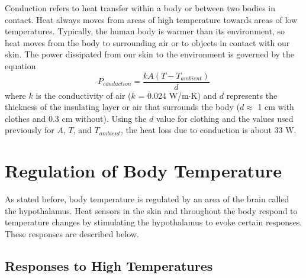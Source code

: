 Conduction refers to heat transfer within a body or between two bodies in contact.  Heat always moves from areas of high temperature towards areas of low temperatures.  Typically, the human body is warmer than its environment, so heat moves from the body to surrounding air or to objects in contact with our skin.  The power dissipated from our skin to the environment is governed by the equation
\begin{equation}\label{eqn4-3}
P_{conduction} = \frac{kA\left(T-T_{ambient}\right)}{d}
\end{equation}
where $k$ is the conductivity of air ($k$ = 0.024 W/m$\cdot$K) and $d$ represents the thickness of the insulating layer or air that surrounds the body ($d\approx$ 1 cm with clothes and 0.3 cm without).  Using the $d$ value for clothing and the values used previously for $A$, $T$, and $T_{ambient}$, the heat loss due to conduction is about 33 W.

\section{Regulation of Body Temperature}

As stated before, body temperature is regulated by an area of the brain called the hypothalamus.  Heat sensors in the skin and throughout the body respond to temperature changes by stimulating the hypothalamus to evoke certain responses.  These responses are described below.    

\subsection{Responses to High Temperatures}

